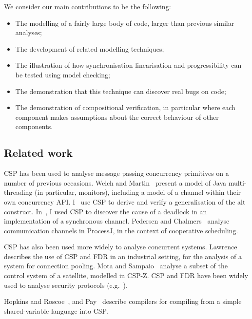 We consider our main contributions to be the following:
%
\begin{itemize}
\item The modelling of a fairly large body of code, larger than previous
  similar analyses;

\item The development of related modelling techniques;

\item The illustration of how synchronisation linearisation and
  progressibility can be tested using model checking;

\item The demonstration that this technique can discover real bugs on code;

\item The demonstration of compositional verification, in particular where
  each component makes assumptions about the correct behaviour of other
  components. 
\end{itemize}



\subsection{Related work}

CSP has been used to analyse message passing concurrency primitives on a
number of previous occasions.
%
Welch and Martin~\cite{welch-martin} present a model of Java multi-threading
(in particular, monitors), including a model of a channel within their own
concurrency API\@.
%
I~\cite{gavin:alt} use CSP to derive and verify a generalisation of the
alt construct.  
%
In~\cite{gavin:OneOne}, I used CSP to discover the cause of a deadlock in an
implementation of a synchronous channel. 
%
Pedersen and Chalmers~\cite{PC23} analyse communication channels in ProcessJ,
in the context of cooperative scheduling.

CSP has also been used more widely to analyse concurrent systems. 
%
Lawrence~\cite{lawrence} describes the use of CSP and FDR in an
industrial setting, for the analysis of a system for connection pooling.
% 
Mota and Sampaio~\cite{mota+sampaio} analyse a subset of the
control system of a satellite, modelled in CSP-Z\@.  
%
CSP and FDR have been widely used to analyse security protocols
(e.g.~\cite{gavin:NSFDR}).

Hopkins and Roscoe~\cite{hopkins-roscoe}, and Pay~\cite{alex:project} describe
compilers for compiling from a simple shared-variable language into CSP\@.




